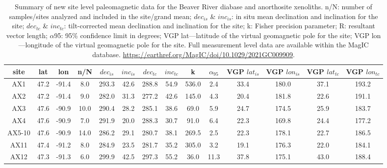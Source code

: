 \begin{table}
\scriptsize
\caption[Summary of new site level paleomagnetic data for the Beaver River diabase and anorthosite xenoliths.]{\footnotesize Summary of new site level paleomagnetic data for the Beaver River diabase and anorthosite xenoliths. n/N: number of samples/sites analyzed and included in the site/grand mean; $dec_{is}$ \& $inc_{is}$: in situ mean declination and inclination for the site; $dec_{tc}$ \& $inc_{tc}$: tilt-corrected mean declination and inclination for the site; k: Fisher precision parameter; R: resultant vector length; $\alpha$95: 95\% confidence limit in degrees; VGP lat—latitude of the virtual geomagnetic pole for the site; VGP lon—longitude of the virtual geomagnetic pole for the site. Full measurement level data are available within the MagIC database. \url{https://earthref.org/MagIC/doi/10.1029/2021GC009909}.}
\centering
\begin{tabular}{cccccccccccccc}
\hline
site             & lat  & lon   & n/N  & $dec_{is}$ & $inc_{is}$ & $dec_{tc}$ & $inc_{tc}$ & k     & $\alpha_{95}$ & VGP $lat_{is}$ & VGP $lon_{is}$ & VGP $lat_{tc}$ & VGP $lon_{tc}$ \\
\hline
AX1              & 47.2 & -91.4 & 8.0  & 293.3   & 42.6         & 288.8   & 54.9    & 536.0 & 2.4                     & 33.4        & 180.0       & 37.1         & 193.2        \\
AX2              & 47.2 & -91.4 & 9.0  & 282.0   & 31.3         & 277.2   & 42.6    & 145.0 & 4.3                     & 20.4        & 181.8       & 22.6         & 191.1        \\
AX3              & 47.6 & -90.9 & 10.0 & 290.4   & 28.2         & 285.1   & 38.6    & 69.0  & 5.9                     & 24.7        & 174.5       & 25.9         & 183.7        \\
AX4              & 47.6 & -90.9 & 7.0  & 291.9   & 20.0         & 288.3   & 30.7    & 91.0  & 6.4                     & 22.3        & 169.8       & 24.4         & 177.2        \\
AX5-10           & 47.6 & -90.9 & 14.0 & 286.2   & 29.1         & 280.7   & 38.1    & 269.5 & 2.5                     & 22.3        & 178.1       & 22.7         & 186.5        \\
AX11             & 47.4 & -91.2 & 8.0  & 284.9   & 23.5         & 281.7   & 35.2    & 305.0 & 3.2                     & 19.1        & 176.3       & 22.0         & 184.1        \\
AX12             & 47.3 & -91.3 & 6.0  & 299.9   & 42.5         & 297.3   & 55.2    & 36.0  & 11.3                    & 37.8        & 175.1       & 43.0         & 188.4        \\

\end{tabular}
\end{table}
